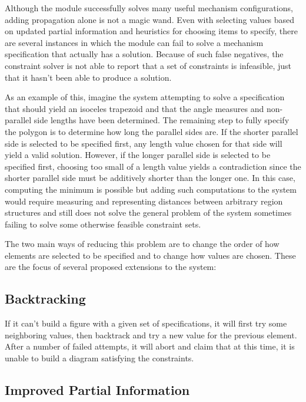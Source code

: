 Although the module successfully solves many useful mechanism
configurations, adding propagation alone is not a magic wand. Even
with selecting values based on updated partial information and
heuristics for choosing items to specify, there are several instances
in which the module can fail to solve a mechanism specification that
actually has a solution. Because of such false negatives, the
constraint solver is not able to report that a set of constraints is
infeasible, just that it hasn't been able to produce a solution.

As an example of this, imagine the system attempting to solve a
specification that should yield an isoceles trapezoid and that the
angle measures and non-parallel side lengths have been determined. The
remaining step to fully specify the polygon is to determine how long
the parallel sides are. If the shorter parallel side is selected to be
specified first, any length value chosen for that side will yield a
valid solution. However, if the longer parallel side is selected to be
specified first, choosing too small of a length value yields a
contradiction since the shorter parallel side must be additively
shorter than the longer one. In this case, computing the minimum is
possible but adding such computations to the system would require
measuring and representing distances between arbitrary region
structures and still does not solve the general problem of the system
sometimes failing to solve some otherwise feasible constraint sets.

The two main ways of reducing this problem are to change the order of
how elements are selected to be specified and to change how values are
chosen. These are the focus of several proposed extensions to the system:

\subsection{Backtracking}

If it can't build a figure with a given set of specifications, it will
first try some neighboring values, then backtrack and try a new value
for the previous element. After a number of failed attempts, it will
abort and claim that at this time, it is unable to build a diagram
satisfying the constraints.

\subsection{Improved Partial Information}

